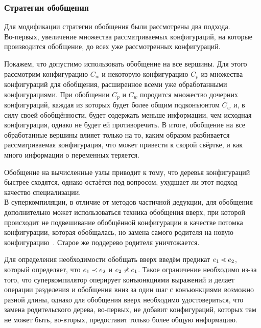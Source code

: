 \subsubsection{Стратегии обобщения}

Для модификации стратегии обобщения были рассмотрены два подхода. \\



Во-первых, увеличение множества рассматриваемых конфигураций, на которые
производится обобщение, до всех уже рассмотренных конфигураций.

Покажем, что допустимо использовать обобщение на все вершины.
Для этого рассмотрим конфигурацию $C_w$ и некоторую конфигурацию $C_p$ из множества
конфигураций для обобщения, расширенное всеми уже обработанными конфигурациями.
При обобщении $C_p$ и $C_w$ породится множество дочерних конфигураций, %
каждая из которых будет более общим подконъюнтом $C_w$ и, в силу своей
обобщённости, будет содержать меньше информации, чем исходная конфигурация,
однако не будет ей противоречить. В итоге, обобщение на все обработанные
вершины влияет только на то, каким образом разбивается рассматриваемая
конфигурация, что может привести к скорой свёртке, и как много информации о
переменных теряется. 


Обобщение на вычисленные узлы приводит к тому, что деревья конфигураций
быстрее сходятся, однако остаётся под вопросом, ухудшает ли этот подход
качество специализации. \\



В суперкомпиляции, в отличие от методов частичной дедукции, для обобщения дополнительно может использоваться
техника обобщения вверх, при которой происходит не подвешивание обобщённой конфигурации
в качестве потомка конфигурации, которая обобщалась, но замена самого родителя на
новую конфигурацию~\cite{scPos}. Старое же поддерево родителя уничтожается.

Для определения необходимости обобщать вверх введём предикат $e_1 \lessdot e_2$,
который определяет, что $e_1 \prec e_2$ и $e_2 \not\prec e_1$.
Такое ограничение необходимо из-за того, что суперкомпилятор оперирует
конъюнкциями выражений и делает операции разделения и обобщения вниз
за один шаг с конъюнкциями возможно разной длины, однако для обобщения
вверх необходимо удостовериться, что замена родительского дерева, во-первых,
не добавит конфигураций, которых там не может быть, во-вторых, предоставит
только более общую информацию.

